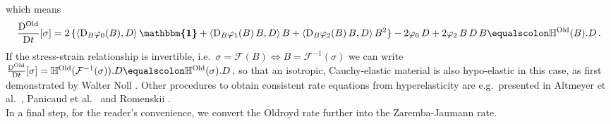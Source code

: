 \documentclass[10pt]{article}
\numberwithin{theoremCounter}{section}
\theoremstyle{plain}
\theoremstyle{definition}
\newcommand{\id}{{\boldsymbol{\mathbbm{1}}}}
\newcommand{\DD}{\mathrm{D}}
\DeclareMathOperator{\Old}{Old}
\def\H{\mathbb{H}}
\numberwithin{equation}{section}
\begin{document}
\begin{appendix}
\begin{equation}
\begin{alignedat}{2}
	\end{alignedat}
	\end{equation}
which means
	\begin{equation}
	\label{eqlongoldr}
	\begin{alignedat}{2}
	\frac{\DD^{\Old}}{\DD t}[\sigma] &=2 \, \{\langle \DD_B\varphi_0(B), D \rangle \, \id + \langle \DD_B \varphi_1(B) \, B, D \rangle \, B + \langle \DD_B \varphi_2(B) \, B, D \rangle \, B^2\} - 2 \varphi_0 \, D + 2 \varphi_2 \, B \, D \, B \equalscolon \H^{\Old}(B).D \, .
	\end{alignedat}
	\end{equation}
If the stress-strain relationship is invertible, i.e.~$\sigma = \mathcal{F}(B) \iff B = \mathcal{F}^{-1}(\sigma)$ we can write \newline
	$
	\frac{\DD^{\Old}}{\DD t}[\sigma] = \H^{\Old}(\mathcal{F}^{-1}(\sigma)).D \equalscolon \H^{\Old}(\sigma).D \, ,
	$
so that an isotropic, Cauchy-elastic material is also hypo-elastic in this case, as first demonstrated by Walter Noll \cite{Noll55}. Other procedures to obtain consistent rate equations from hyperelasticity are e.g.~presented in Altmeyer et al.~\cite{altmeyer2016}, Panicaud et al.~\cite{Panicaud2016} and Romenskii \cite{romenskii1974}. \\
%
In a final step, for the reader's convenience, we convert the Oldroyd rate further into the Zaremba-Jaumann rate.
%

\end{appendix}
\end{document}
